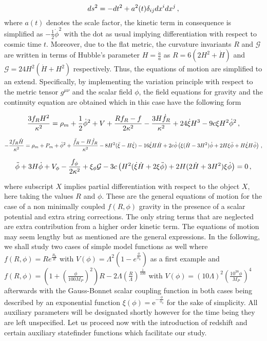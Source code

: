 \documentclass[aps,prd,twocolumn,groupedaddress,showpacs,nofootinbib,amssymb]{revtex4-2}
\newcommand\e{\mathrm{e}}
\begin{document}
\begin{equation}
\centering
\label{line}
ds^2=-dt^2+a^2(t)\delta_{ij}dx^idx^j\, ,
\end{equation}
where $a(t)$ denotes the scale factor, the kinetic term in consequence is simplified as $-\frac{1}{2}\dot\phi^2$ with the dot as usual implying differentiation with respect to cosmic time $t$. Moreover, due to the flat metric, the curvature invariants $R$ and $\mathcal{G}$ are written in terms of Hubble's parameter $H=\frac{\dot a}{a}$ as $R=6(2H^2+\dot H)$ and $\mathcal{G}=24H^2(\dot H+H^2)$ respectively. Thus, the equations of motion are simplified to an extend. Specifically, by implementing the variation principle with respect to the metric tensor $g^{\mu\nu}$ and the scalar field $\phi$, the field equations for gravity and the continuity equation are obtained which in this case have the following form

\begin{widetext}
\begin{equation}
\centering
\label{motion1}
\frac{3f_RH^2}{\kappa^2}=\rho_m+\frac{1}{2}\dot\phi^2+V+\frac{Rf_R-f}{2\kappa^2}-\frac{3H\dot f_R}{\kappa^2}+24\dot\xi H^3-9c\xi H^2\dot\phi^2\, ,
\end{equation}


\begin{equation}
\centering
\label{motion2}
-\frac{2f_R\dot H}{\kappa^2}=\rho_m+P_m+\dot\phi^2+\frac{\ddot f_R-H\dot f_R}{\kappa^2}-8H^2(\ddot\xi-H\dot\xi)-16\dot\xi H\dot H+2c\dot\phi\left(\xi(\dot H-3H^2)\dot\phi+2H\xi\ddot\phi+H\dot\xi H\dot\phi\right)\, ,
\end{equation}

\begin{equation}
\centering
\label{motion3}
\ddot\phi+3H\dot\phi+V_\phi-\frac{f_\phi}{2\kappa^2}+\xi_\phi\mathcal{G}-3c\left(H^2(\dot\xi\dot H+2\xi\ddot\phi)+2H(2\dot H+3H^2)\xi\dot\phi\right)=0\, ,
\end{equation}
\end{widetext}
where subscript $X$ implies partial differentiation with respect to the object $X$, here taking the values $R$ and $\phi$. These are the general equations of motion for the case of a non minimally coupled $f(R,\phi)$ gravity in the presence of a scalar potential and extra string corrections. The only string terms that are neglected are extra contribution from a higher order kinetic term. The equations of motion may seem lengthy but as mentioned are the general expressions. In the following, we shall study two cases of simple model functions as well where $f(R,\phi)=Re^{\frac{R_0}{R}}$ with $V(\phi)=\Lambda^2(1-e^{\frac{\phi}{\phi_0}})$ as a first example and $f(R,\phi)=\left(1+\left(\frac{\phi}{100M_P}\right)^2\right)R-2\Lambda\left(\frac{R}{\Lambda}\right)^{\frac{1}{100}}$ with $V(\phi)=(10\Lambda)^2\left(\frac{10^{38}\phi}{M_P}\right)^4$ afterwards with the Gauss-Bonnet scalar coupling function in both cases being described by an exponential function $\xi(\phi)=\e^{-\frac{\phi}{\phi_0}}$ for the sake of simplicity. All auxiliary parameters will be designated shortly however for the time being they are left unspecified. Let us proceed now with the introduction of redshift and certain auxiliary statefinder functions which facilitate our study.
\end{document}
